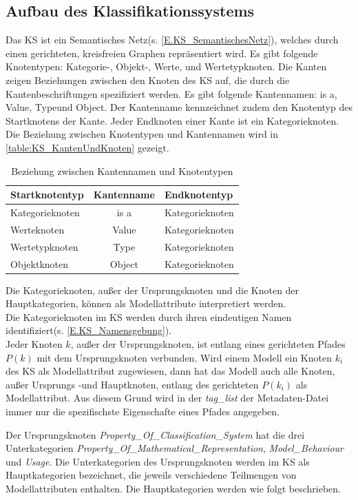 \subsection{Aufbau des Klassifikationssystems}
\label{Ch:Ergebniss:Sec:KS:SubSec:Aufbau}
Das KS ist ein Semantisches Netz(s. \ref{E.KS_SemantischesNetz}), welches durch einen gerichteten, kreisfreien Graphen repräsentiert wird. Es gibt folgende Knotentypen: Kategorie-, Objekt-, Werte, und Wertetypknoten. 
Die Kanten zeigen Beziehungen zwischen den Knoten des KS auf, die durch die Kantenbeschriftungen spezifiziert werden. Es gibt folgende Kantennamen: \glqq is a\grqq, \glqq Value\grqq, \glqq Type\grqq und \glqq Object\grqq. Der Kantenname kennzeichnet zudem den Knotentyp des Startknotens der Kante. Jeder Endknoten einer Kante ist ein Kategorieknoten. Die Beziehung zwischen Knotentypen und Kantennamen wird in \autoref{table:KS_KantenUndKnoten} gezeigt.
\begin{table}[H]
	\centering
	\begin{tabular}{l|c|l}
		Startknotentyp & Kantenname & Endknotentyp \\ \hline
		Kategorieknoten & is a & Kategorieknoten \\
		Werteknoten & Value & Kategorieknoten \\
		Wertetypknoten & Type & Kategorieknoten \\
		Objektknoten & Object & Kategorieknoten
	\end{tabular}
	\caption{Beziehung zwischen Kantennamen und Knotentypen}
	\label{table:KS_KantenUndKnoten}
\end{table}
%
Die Kategorieknoten, außer der Ursprungsknoten und die Knoten der Hauptkategorien, können als Modellattribute interpretiert werden. \\
Die Kategorieknoten im KS werden durch ihren eindeutigen Namen identifiziert(s. \ref{E.KS_Namensgebung}).\\
Jeder Knoten $k$, außer der Ursprungsknoten, ist entlang eines gerichteten Pfades $P(k)$ mit dem Ursprungsknoten verbunden. Wird einem Modell ein Knoten $k_i$ des KS als Modellattribut zugewiesen, dann hat das Modell auch alle Knoten, außer Ursprungs -und Hauptknoten, entlang des gerichteten $P(k_i)$ als Modellattribut. Aus diesem Grund wird in der \textit{tag\_list} der Metadaten-Datei immer nur die spezifischste Eigenschafte eines Pfades angegeben. %

Der Ursprungsknoten \textit{Property\_Of\_Classification\_System} hat die drei Unterkategorien \textit{Property\_Of\_Mathematical\_Representation}, \textit{Model\_Behaviour} und \textit{Usage}. Die Unterkategorien des Ursprungsknoten werden im KS als Hauptkategorien bezeichnet, die jeweils verschiedene Teilmengen von Modellattributen enthalten. Die Hauptkategorien werden wie folgt beschrieben.

